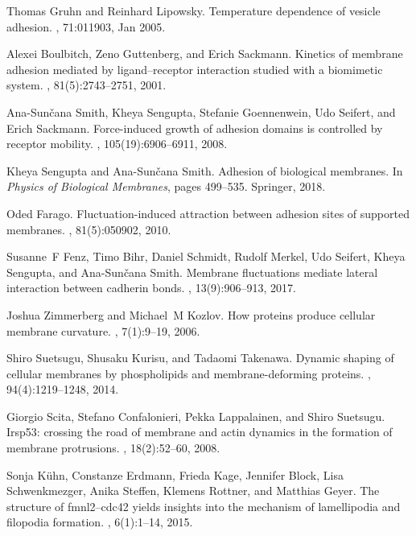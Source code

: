 \documentclass[pre,amsmath]{revtex4}
\begin{document}
\begin{thebibliography}{10}
Thomas Gruhn and Reinhard Lipowsky.
\newblock Temperature dependence of vesicle adhesion.
, 71:011903, Jan 2005.

Alexei Boulbitch, Zeno Guttenberg, and Erich Sackmann.
\newblock Kinetics of membrane adhesion mediated by ligand--receptor
  interaction studied with a biomimetic system.
, 81(5):2743--2751, 2001.

Ana-Sun{\v{c}}ana Smith, Kheya Sengupta, Stefanie Goennenwein, Udo Seifert, and
  Erich Sackmann.
\newblock Force-induced growth of adhesion domains is controlled by receptor
  mobility.
,
  105(19):6906--6911, 2008.

Kheya Sengupta and Ana-Sun{\v{c}}ana Smith.
\newblock Adhesion of biological membranes.
\newblock In {\em Physics of Biological Membranes}, pages 499--535. Springer,
  2018.

Oded Farago.
\newblock Fluctuation-induced attraction between adhesion sites of supported
  membranes.
, 81(5):050902, 2010.

Susanne~F Fenz, Timo Bihr, Daniel Schmidt, Rudolf Merkel, Udo Seifert, Kheya
  Sengupta, and Ana-Sun{\v{c}}ana Smith.
\newblock Membrane fluctuations mediate lateral interaction between cadherin
  bonds.
, 13(9):906--913, 2017.

Joshua Zimmerberg and Michael~M Kozlov.
\newblock How proteins produce cellular membrane curvature.
, 7(1):9--19, 2006.

Shiro Suetsugu, Shusaku Kurisu, and Tadaomi Takenawa.
\newblock Dynamic shaping of cellular membranes by phospholipids and
  membrane-deforming proteins.
, 94(4):1219--1248, 2014.

Giorgio Scita, Stefano Confalonieri, Pekka Lappalainen, and Shiro Suetsugu.
\newblock Irsp53: crossing the road of membrane and actin dynamics in the
  formation of membrane protrusions.
, 18(2):52--60, 2008.

Sonja K{\"u}hn, Constanze Erdmann, Frieda Kage, Jennifer Block, Lisa
  Schwenkmezger, Anika Steffen, Klemens Rottner, and Matthias Geyer.
\newblock The structure of fmnl2--cdc42 yields insights into the mechanism of
  lamellipodia and filopodia formation.
, 6(1):1--14, 2015.


\end{thebibliography}
\end{document}
